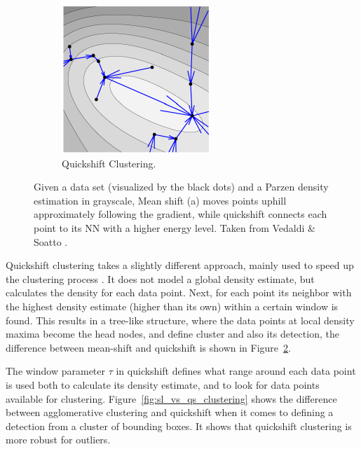 \begin{figure}[hbt]
\begin{subfigure}[b]{0.45\textwidth}
            \includegraphics[width=\textwidth]{QuickShift}
            \caption{Quickshift Clustering.}
            \label{fig:qs}
    \end{subfigure}
    \caption{Given a data set (visualized by the black dots) and a Parzen density estimation in grayscale, Mean shift (a) moves points uphill approximately following the gradient, while quickshift connects each point to its NN with a higher energy level. Taken from Vedaldi \& Soatto \cite{vedaldi2008quick}.}
    \label{fig:ms_qs}
\end{figure}

Quickshift clustering takes a slightly different approach, mainly used to speed up the clustering process \cite{vedaldi2008quick}. It does not model a global density estimate, but calculates the density for each data point. Next, for each point its neighbor with the highest density estimate (higher than its own) within a certain window is found. This results in a tree-like structure, where the data points at local density maxima become the head nodes, and define cluster and also its detection, the difference between mean-shift and quickshift is shown in Figure~\ref{fig:ms_qs}.

The window parameter $\tau$ in quickshift defines what range around each data point is used both to calculate its density estimate, and to look for data points available for clustering. Figure~\ref{fig:sl_vs_qs_clustering} shows the difference between agglomerative clustering and quickshift when it comes to defining a detection from a cluster of bounding boxes. It shows that quickshift clustering is more robust for outliers.



